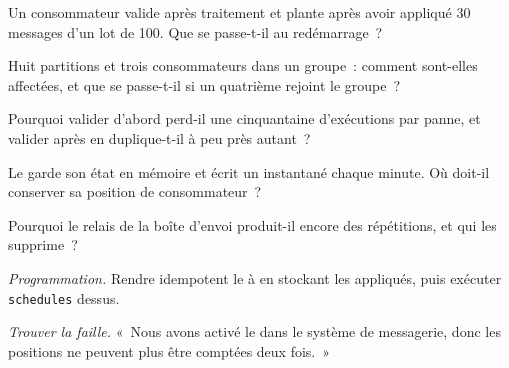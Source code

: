 \begin{exercise}[$\star$]\label{exo:pl:messaging-and-event-driven-architecture:2}
Un consommateur valide après traitement et plante après avoir appliqué 30 messages d'un lot de 100. Que se passe-t-il au redémarrage~?
\end{exercise}

\begin{exercise}[$\star$]\label{exo:pl:messaging-and-event-driven-architecture:3}
Huit partitions et trois consommateurs dans un groupe~: comment sont-elles affectées, et que se passe-t-il si un quatrième rejoint le groupe~?
\end{exercise}

\begin{exercise}[$\star\star$]\label{exo:pl:messaging-and-event-driven-architecture:4}
Pourquoi valider d'abord perd-il une cinquantaine d'exécutions par panne, et valider après en duplique-t-il à peu près autant~?
\end{exercise}

\begin{exercise}[$\star\star$]\label{exo:pl:messaging-and-event-driven-architecture:5}
Le  garde son état en mémoire et écrit un instantané chaque minute. Où doit-il conserver sa position de consommateur~?
\end{exercise}

\begin{exercise}[$\star\star$]\label{exo:pl:messaging-and-event-driven-architecture:6}
Pourquoi le relais de la boîte d'envoi produit-il encore des répétitions, et qui les supprime~?
\end{exercise}

\begin{exercise}[$\star\star\star$]\label{exo:pl:messaging-and-event-driven-architecture:7}
\emph{Programmation.} Rendre idempotent le  à  en stockant les  appliqués, puis exécuter \texttt{schedules} dessus.
\end{exercise}

\begin{exercise}[$\star\star\star$]\label{exo:pl:messaging-and-event-driven-architecture:8}
\emph{Trouver la faille.} «~Nous avons activé le  dans le système de messagerie, donc les positions ne peuvent
plus être comptées deux fois.~»
\end{exercise}

